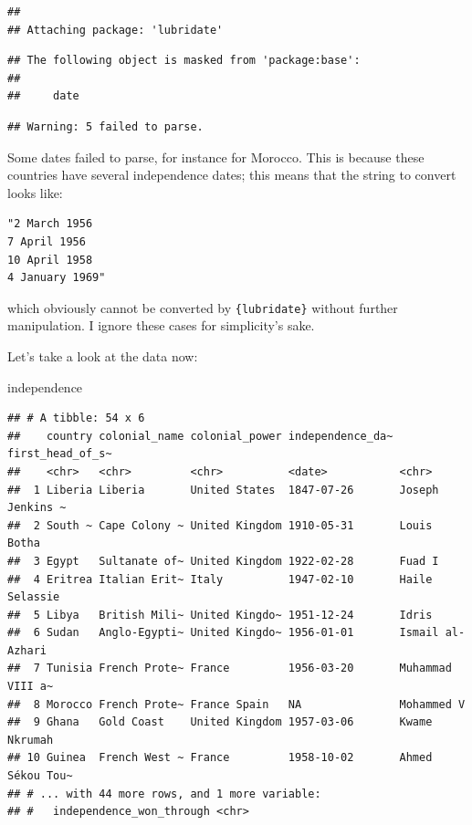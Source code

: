 \documentclass[]{gitbook}
\newenvironment{Shaded}{\begin{snugshade}}{\end{snugshade}}
\newcommand{\DataTypeTok}[1]{\textcolor[rgb]{0.13,0.29,0.53}{#1}}
\newcommand{\KeywordTok}[1]{\textcolor[rgb]{0.13,0.29,0.53}{\textbf{#1}}}
\newcommand{\NormalTok}[1]{#1}
\newcommand{\OperatorTok}[1]{\textcolor[rgb]{0.81,0.36,0.00}{\textbf{#1}}}
\newcommand{\StringTok}[1]{\textcolor[rgb]{0.31,0.60,0.02}{#1}}
\theoremstyle{definition}
\theoremstyle{definition}
\theoremstyle{definition}
\theoremstyle{remark}
\begin{document}
\begin{verbatim}
## 
## Attaching package: 'lubridate'
\end{verbatim}

\begin{verbatim}
## The following object is masked from 'package:base':
## 
##     date
\end{verbatim}

\begin{Shaded}
\end{Shaded}

\begin{verbatim}
## Warning: 5 failed to parse.
\end{verbatim}

Some dates failed to parse, for instance for Morocco. This is because
these countries have several independence dates; this means that the
string to convert looks like:

\begin{verbatim}
"2 March 1956
7 April 1956
10 April 1958
4 January 1969"
\end{verbatim}

which obviously cannot be converted by \texttt{\{lubridate\}} without
further manipulation. I ignore these cases for simplicity's sake.

Let's take a look at the data now:

\begin{Shaded}
\begin{Highlighting}[]
\NormalTok{independence}
\end{Highlighting}
\end{Shaded}

\begin{verbatim}
## # A tibble: 54 x 6
##    country colonial_name colonial_power independence_da~ first_head_of_s~
##    <chr>   <chr>         <chr>          <date>           <chr>           
##  1 Liberia Liberia       United States  1847-07-26       Joseph Jenkins ~
##  2 South ~ Cape Colony ~ United Kingdom 1910-05-31       Louis Botha     
##  3 Egypt   Sultanate of~ United Kingdom 1922-02-28       Fuad I          
##  4 Eritrea Italian Erit~ Italy          1947-02-10       Haile Selassie  
##  5 Libya   British Mili~ United Kingdo~ 1951-12-24       Idris           
##  6 Sudan   Anglo-Egypti~ United Kingdo~ 1956-01-01       Ismail al-Azhari
##  7 Tunisia French Prote~ France         1956-03-20       Muhammad VIII a~
##  8 Morocco French Prote~ France Spain   NA               Mohammed V      
##  9 Ghana   Gold Coast    United Kingdom 1957-03-06       Kwame Nkrumah   
## 10 Guinea  French West ~ France         1958-10-02       Ahmed Sékou Tou~
## # ... with 44 more rows, and 1 more variable:
## #   independence_won_through <chr>
\end{verbatim}
\end{document}
